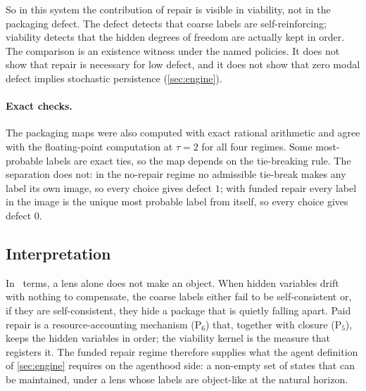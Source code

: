 So in this system the contribution of repair is visible in viability, not in the packaging defect. The defect detects that coarse labels are self-reinforcing; viability detects that the hidden degrees of freedom are actually kept in order. The comparison is an existence witness under the named policies. It does not show that repair is necessary for low defect, and it does not show that zero modal defect implies stochastic persistence (\cref{sec:engine}).

\paragraph{Exact checks.}
The packaging maps were also computed with exact rational arithmetic and agree with the floating-point computation at $\tau=2$ for all four regimes. Some most-probable labels are exact ties, so the map depends on the tie-breaking rule. The separation does not: in the no-repair regime no admissible tie-break makes any label its own image, so every choice gives defect $1$; with funded repair every label in the image is the unique most probable label from itself, so every choice gives defect $0$.

\subsection{Interpretation}
In \SBT\ terms, a lens alone does not make an object. When hidden variables drift with nothing to compensate, the coarse labels either fail to be self-consistent or, if they are self-consistent, they hide a package that is quietly falling apart. Paid repair is a resource-accounting mechanism (P$_6$) that, together with closure (P$_5$), keeps the hidden variables in order; the viability kernel is the measure that registers it. The funded repair regime therefore supplies what the agent definition of \cref{sec:engine} requires on the agenthood side: a non-empty set of states that can be maintained, under a lens whose labels are object-like at the natural horizon.
